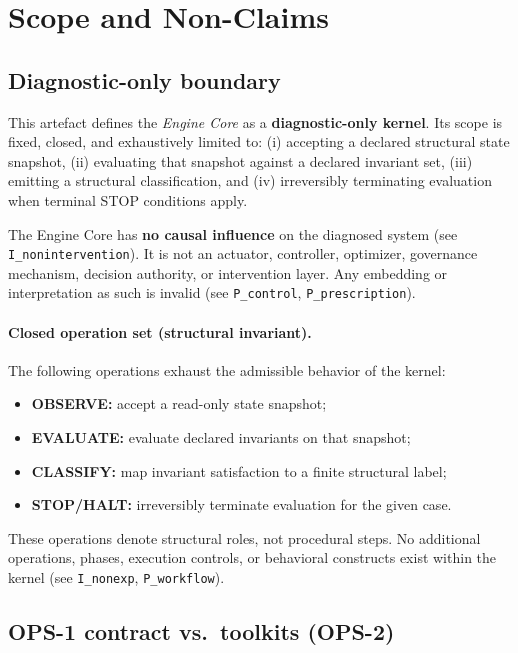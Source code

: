 ﻿\section{Scope and Non-Claims}

\subsection{Diagnostic-only boundary}

This artefact defines the \emph{Engine Core} as a \textbf{diagnostic-only kernel}.
Its scope is fixed, closed, and exhaustively limited to:
(i) accepting a declared structural state snapshot,
(ii) evaluating that snapshot against a declared invariant set,
(iii) emitting a structural classification, and
(iv) irreversibly terminating evaluation when terminal STOP conditions apply.

The Engine Core has \textbf{no causal influence} on the diagnosed system
(see \texttt{I\_nonintervention}).
It is not an actuator, controller, optimizer, governance mechanism,
decision authority, or intervention layer.
Any embedding or interpretation as such is invalid
(see \texttt{P\_control}, \texttt{P\_prescription}).

\paragraph{Closed operation set (structural invariant).}
The following operations exhaust the admissible behavior of the kernel:
\begin{itemize}
  \item \textbf{OBSERVE:} accept a read-only state snapshot;
  \item \textbf{EVALUATE:} evaluate declared invariants on that snapshot;
  \item \textbf{CLASSIFY:} map invariant satisfaction to a finite structural label;
  \item \textbf{STOP/HALT:} irreversibly terminate evaluation for the given case.
\end{itemize}

These operations denote structural roles, not procedural steps.
No additional operations, phases, execution controls, or behavioral constructs
exist within the kernel (see \texttt{I\_nonexp}, \texttt{P\_workflow}).

\subsection{OPS-1 contract vs.\ toolkits (OPS-2)}

